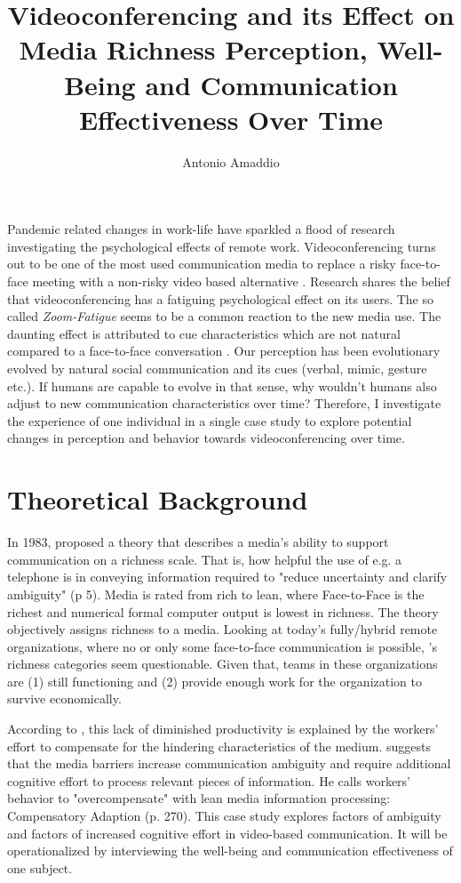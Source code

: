 \documentclass[man]{apa7}
\title{Videoconferencing and its Effect on Media Richness Perception, Well-Being and Communication Effectiveness Over Time}
\author{Antonio Amaddio}
\affiliation{Freie Universität Berlin \\ A\&O Vertiefung, Winter 2022/23, Supervisor: Dr. Lisa Handke}
\begin{document}
\maketitle
Pandemic related changes in work-life have sparkled a flood of research investigating the psychological effects of remote work. Videoconferencing turns out to be one of the most used communication media to replace a risky face-to-face meeting with a non-risky video based alternative \parencite{Riedl2021}.  Research shares the belief that videoconferencing has a fatiguing psychological effect on its users. The so called \textit{Zoom-Fatigue} seems to be a common reaction to the new media use. The daunting effect is attributed to cue characteristics which are not natural compared to a face-to-face conversation \parencite{Riedl2021}. Our perception has been evolutionary evolved by natural social communication and its cues (verbal, mimic, gesture etc.). If humans are capable to evolve in that sense, why wouldn't humans also adjust to new communication characteristics over time? Therefore, I investigate the experience of one individual in a single case study to explore potential changes in perception and behavior towards videoconferencing over time.

\section{Theoretical Background}

In 1983, \citeauthor{daft1983information} proposed a theory that describes a media’s ability to support communication on a richness scale. That is, how helpful the use of e.g. a telephone is in conveying information required to "reduce uncertainty and clarify ambiguity" (p 5). Media is rated from rich to lean, where Face-to-Face is the richest and numerical formal computer output is lowest in richness. The theory objectively assigns richness to a media. Looking at today’s fully/hybrid remote organizations, where no or only some face-to-face communication is possible, \citeauthor{daft1983information}'s richness categories seem questionable. Given that, teams in these organizations are (1) still functioning and (2) provide enough work for the organization to survive economically.

According to \citeauthor{Kock2005}, this lack of diminished productivity is explained by the workers' effort to compensate for the hindering characteristics of the medium. \citeauthor{Kock2005} suggests that the media barriers increase communication ambiguity and require additional cognitive effort to process relevant pieces of information. He calls workers' behavior to "overcompensate" with lean media information processing: Compensatory Adaption (p. 270). This case study explores factors of ambiguity and factors of increased cognitive effort in video-based communication. It will be operationalized by interviewing the well-being and communication effectiveness of one subject.
\end{document}
